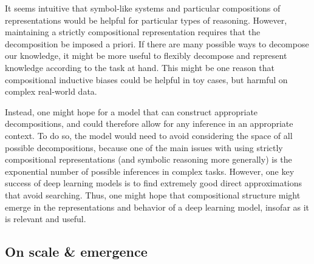 It seems intuitive that symbol-like systems and particular compositions of representations would be helpful for particular types of reasoning. However, maintaining a strictly compositional representation requires that the decomposition be imposed a priori. If there are many possible ways to decompose our knowledge, it might be more useful to flexibly decompose and represent knowledge according to the task at hand. This might be one reason that compositional inductive biases could be helpful in toy cases, but harmful on complex real-world data.\par
Instead, one might hope for a model that can construct appropriate decompositions, and could therefore allow for any inference in an appropriate context. To do so, the model would need to avoid considering the space of all possible decompositions, because one of the main issues with using strictly compositional representations (and symbolic reasoning more generally) is the exponential number of possible inferences in complex tasks. However, one key success of deep learning models is to find extremely good direct approximations that avoid searching. Thus, one might hope that compositional structure might emerge in the representations and behavior of a deep learning model, insofar as it is relevant and useful.\par 

\subsection{On scale \& emergence}

